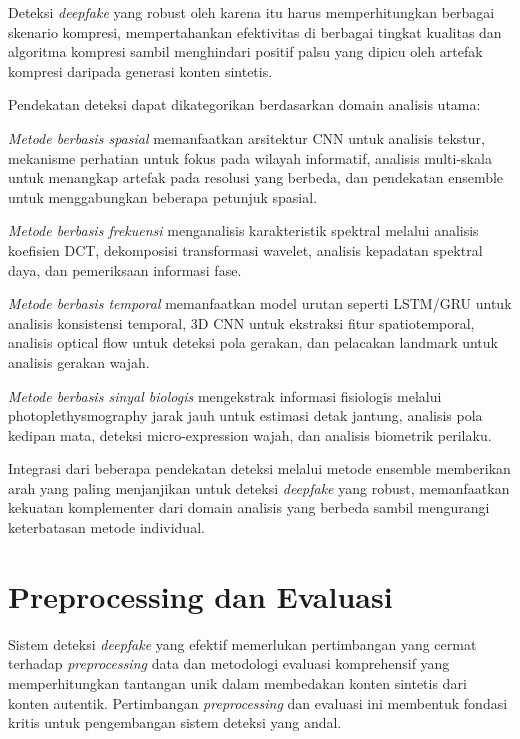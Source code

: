 Deteksi \textit{deepfake} yang robust oleh karena itu harus memperhitungkan berbagai skenario kompresi, mempertahankan efektivitas di berbagai tingkat kualitas dan algoritma kompresi sambil menghindari positif palsu yang dipicu oleh artefak kompresi daripada generasi konten sintetis.

Pendekatan deteksi dapat dikategorikan berdasarkan domain analisis utama:

\textit{Metode berbasis spasial} memanfaatkan arsitektur CNN untuk analisis tekstur, mekanisme perhatian untuk fokus pada wilayah informatif, analisis multi-skala untuk menangkap artefak pada resolusi yang berbeda, dan pendekatan ensemble untuk menggabungkan beberapa petunjuk spasial.

\textit{Metode berbasis frekuensi} menganalisis karakteristik spektral melalui analisis koefisien DCT, dekomposisi transformasi wavelet, analisis kepadatan spektral daya, dan pemeriksaan informasi fase.

\textit{Metode berbasis temporal} memanfaatkan model urutan seperti LSTM/GRU untuk analisis konsistensi temporal, 3D CNN untuk ekstraksi fitur spatiotemporal, analisis optical flow untuk deteksi pola gerakan, dan pelacakan landmark untuk analisis gerakan wajah.

\textit{Metode berbasis sinyal biologis} mengekstrak informasi fisiologis melalui photoplethysmography jarak jauh untuk estimasi detak jantung, analisis pola kedipan mata, deteksi micro-expression wajah, dan analisis biometrik perilaku.

Integrasi dari beberapa pendekatan deteksi melalui metode ensemble memberikan arah yang paling menjanjikan untuk deteksi \textit{deepfake} yang robust, memanfaatkan kekuatan komplementer dari domain analisis yang berbeda sambil mengurangi keterbatasan metode individual.

\section{Preprocessing dan Evaluasi}

Sistem deteksi \textit{deepfake} yang efektif memerlukan pertimbangan yang cermat terhadap \textit{preprocessing} data dan metodologi evaluasi komprehensif yang memperhitungkan tantangan unik dalam membedakan konten sintetis dari konten autentik. Pertimbangan \textit{preprocessing} dan evaluasi ini membentuk fondasi kritis untuk pengembangan sistem deteksi yang andal.

